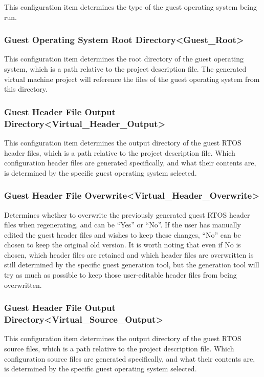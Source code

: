 This configuration item determines the type of the guest operating system being run.

\subsubsection{Guest Operating System Root Directory<Guest\_Root>{}}\label{subsubsec:5-3-15-9}

This configuration item determines the root directory of the guest operating system, which is a path relative to the project description file. The generated virtual machine project will reference the files of the guest operating system from this directory.

\subsubsection{Guest Header File Output Directory<Virtual\_Header\_Output>{}}\label{subsubsec:5-3-15-10}

This configuration item determines the output directory of the guest RTOS header files, which is a path relative to the project description file. Which configuration header files are generated specifically, and what their contents are, is determined by the specific guest operating system selected.

\subsubsection{Guest Header File Overwrite<Virtual\_Header\_Overwrite>{}}\label{subsubsec:5-3-15-11}

Determines whether to overwrite the previously generated guest RTOS header files when regenerating, and can be ``Yes'' or ``No''. If the user has manually edited the guest header files and wishes to keep these changes, ``No'' can be chosen to keep the original old version. It is worth noting that even if No is chosen, which header files are retained and which header files are overwritten is still determined by the specific guest generation tool, but the generation tool will try as much as possible to keep those user-editable header files from being overwritten.

\subsubsection{Guest Header File Output Directory<Virtual\_Source\_Output>{}}\label{subsubsec:5-3-15-12}

This configuration item determines the output directory of the guest RTOS source files, which is a path relative to the project description file. Which configuration source files are generated specifically, and what their contents are, is determined by the specific guest operating system selected.

